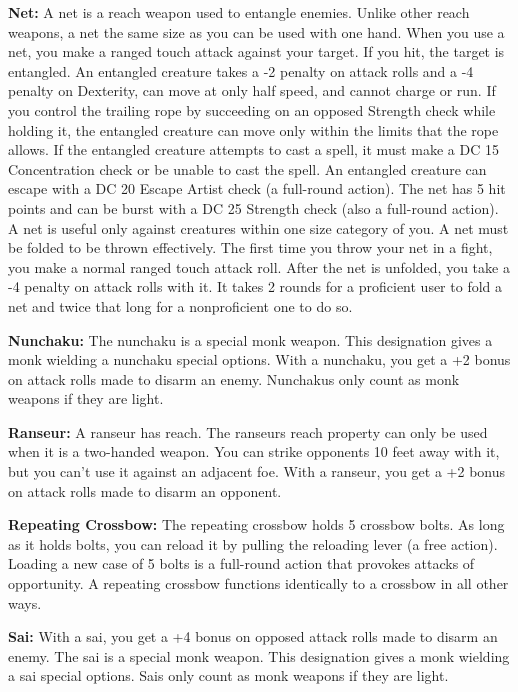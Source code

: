 \textbf{Net:} A net is a reach weapon used to entangle enemies. Unlike other reach weapons, a net the same size as you can be used with one hand. When you use a net, you make a ranged touch attack against your target. If you hit, the target is entangled. An entangled creature takes a -2 penalty on attack rolls and a -4 penalty on Dexterity, can move at only half speed, and cannot charge or run. If you control the trailing rope by succeeding on an opposed Strength check while holding it, the entangled creature can move only within the limits that the rope allows. If the entangled creature attempts to cast a spell, it must make a DC 15 Concentration check or be unable to cast the spell. An entangled creature can escape with a DC 20 Escape Artist check (a full-round action). The net has 5 hit points and can be burst with a DC 25 Strength check (also a full-round action). A net is useful only against creatures within one size category of you. A net must be folded to be thrown effectively. The first time you throw your net in a fight, you make a normal ranged touch attack roll. After the net is unfolded, you take a -4 penalty on attack rolls with it. It takes 2 rounds for a proficient user to fold a net and twice that long for a nonproficient one to do so.

\textbf{Nunchaku:} The nunchaku is a special monk weapon. This designation gives a monk wielding a nunchaku special options. With a nunchaku, you get a +2 bonus on attack rolls made to disarm an enemy. Nunchakus only count as monk weapons if they are light.

\textbf{Ranseur:} A ranseur has reach. The ranseurs reach property can only be used when it is a two-handed weapon. You can strike opponents 10 feet away with it, but you can't use it against an adjacent foe. With a ranseur, you get a +2 bonus on attack rolls made to disarm an opponent.

\textbf{Repeating Crossbow:} The repeating crossbow holds 5 crossbow bolts. As long as it holds bolts, you can reload it by pulling the reloading lever (a free action). Loading a new case of 5 bolts is a full-round action that provokes attacks of opportunity. A repeating crossbow functions identically to a crossbow in all other ways.

\textbf{Sai:} With a sai, you get a +4 bonus on opposed attack rolls made to disarm an enemy. The sai is a special monk weapon. This designation gives a monk wielding a sai special options. Sais only count as monk weapons if they are light.

